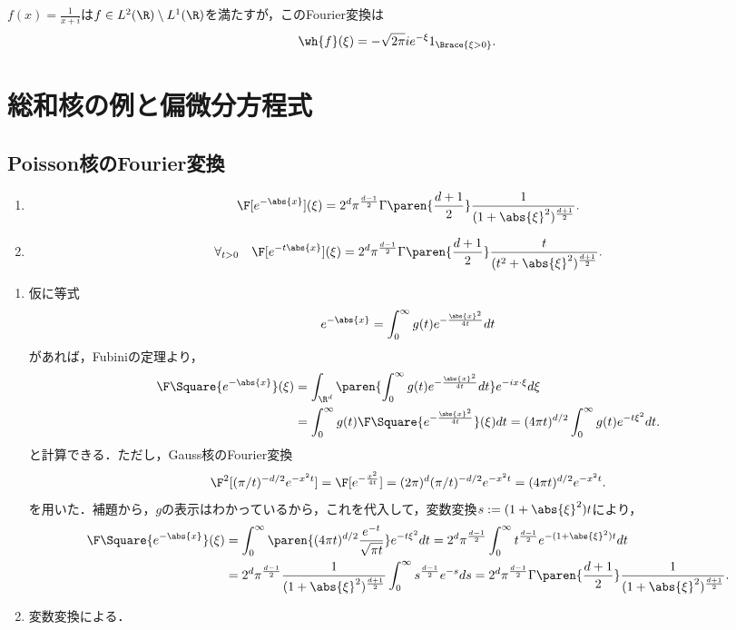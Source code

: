 \documentclass[uplatex,dvipdfmx]{jsreport}
\begin{document}
\begin{proposition}[代表例]
    $f(x)=\frac{1}{x+i}$は$f\in L^2(\R)\setminus L^1(\R)$を満たすが，このFourier変換は
    \[\wh{f}(\xi)=-\sqrt{2\pi}ie^{-\xi}1_{\Brace{\xi>0}}.\]
\end{proposition}

\section{総和核の例と偏微分方程式}

\subsection{Poisson核のFourier変換}

\begin{theorem}[$\R^d$上のPoisson核のFourier変換]\mbox{}\label{thm-Fourier-transform-of-Poisson-kernel-on-Rd}
    \begin{enumerate}
        \item \[\F[e^{-\abs{x}}](\xi)=2^d\pi^{\frac{d-1}{2}}\Gamma\paren{\frac{d+1}{2}}\frac{1}{(1+\abs{\xi}^2)^{\frac{d+1}{2}}}.\]
        \item \[\forall_{t>0}\quad\F[e^{-t\abs{x}}](\xi)=2^d\pi^{\frac{d-1}{2}}\Gamma\paren{\frac{d+1}{2}}\frac{t}{(t^2+\abs{\xi}^2)^{\frac{d+1}{2}}}.\]
    \end{enumerate}
\end{theorem}
\begin{Proof}\mbox{}
    \begin{enumerate}
        \item 仮に等式
        \[e^{-\abs{x}}=\int^\infty_0g(t)e^{-\frac{\abs{x}^2}{4t}}dt\]
        があれば，Fubiniの定理より，
        \begin{align*}
            \F\Square{e^{-\abs{x}}}(\xi)&=\int_{\R^d}\paren{\int^\infty_0g(t)e^{-\frac{\abs{x}^2}{4t}}dt}e^{-ix\cdot\xi}d\xi\\
            &=\int^\infty_0g(t)\F\Square{e^{-\frac{\abs{x}^2}{4t}}}(\xi)dt=(4\pi t)^{d/2}\int^\infty_0g(t)e^{-t\xi^2}dt.
        \end{align*}
        と計算できる．ただし，Gauss核のFourier変換
        \[\F^2[(\pi/t)^{-d/2}e^{-x^2t}]=\F[e^{-\frac{x^2}{4t}}]=(2\pi)^d(\pi/t)^{-d/2}e^{-x^2t}=(4\pi t)^{d/2}e^{-x^2t}.\]
        を用いた．補題から，$g$の表示はわかっているから，これを代入して，変数変換$s:=(1+\abs{\xi}^2)t$により，
        \begin{align*}
            \F\Square{e^{-\abs{x}}}(\xi)&=\int^\infty_0\paren{(4\pi t)^{d/2}\frac{e^{-t}}{\sqrt{\pi t}}}e^{-t\xi^2}dt=2^d\pi^{\frac{d-1}{2}}\int^\infty_0t^{\frac{d-1}{2}}e^{-(1+\abs{\xi}^2)t}dt\\
            &=2^d\pi^{\frac{d-1}{2}}\frac{1}{(1+\abs{\xi}^2)^{\frac{d+1}{2}}}\int^\infty_0s^{\frac{d-1}{2}}e^{-s}ds=2^d\pi^{\frac{d-1}{2}}\Gamma\paren{\frac{d+1}{2}}\frac{1}{(1+\abs{\xi}^2)^{\frac{d+1}{2}}}.
        \end{align*}
        \item 変数変換による．
    \end{enumerate}
\end{Proof}
\end{document}
